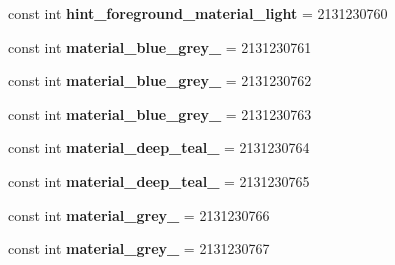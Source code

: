 \begin{DoxyCompactItemize}
\item 
\hypertarget{classClient_1_1Droid_1_1Resource_1_1Color_ac0c400e05663e3e22f4b495dfc34a48b}{}const int {\bfseries hint\+\_\+foreground\+\_\+material\+\_\+light} = 2131230760\label{classClient_1_1Droid_1_1Resource_1_1Color_ac0c400e05663e3e22f4b495dfc34a48b}

\item 
\hypertarget{classClient_1_1Droid_1_1Resource_1_1Color_ae6969d9cf3f2532d9702415e0842bc8d}{}const int {\bfseries material\+\_\+blue\+\_\+grey\+\_} = 2131230761\label{classClient_1_1Droid_1_1Resource_1_1Color_ae6969d9cf3f2532d9702415e0842bc8d}

\item 
\hypertarget{classClient_1_1Droid_1_1Resource_1_1Color_ad5eae1997bab4de0de3f9a33f0cc07a3}{}const int {\bfseries material\+\_\+blue\+\_\+grey\+\_} = 2131230762\label{classClient_1_1Droid_1_1Resource_1_1Color_ad5eae1997bab4de0de3f9a33f0cc07a3}

\item 
\hypertarget{classClient_1_1Droid_1_1Resource_1_1Color_acbba04b06523ce03abf1c4b813ec56b2}{}const int {\bfseries material\+\_\+blue\+\_\+grey\+\_} = 2131230763\label{classClient_1_1Droid_1_1Resource_1_1Color_acbba04b06523ce03abf1c4b813ec56b2}

\item 
\hypertarget{classClient_1_1Droid_1_1Resource_1_1Color_a89b4f470c9563b76f4cd9bab4edc4154}{}const int {\bfseries material\+\_\+deep\+\_\+teal\+\_} = 2131230764\label{classClient_1_1Droid_1_1Resource_1_1Color_a89b4f470c9563b76f4cd9bab4edc4154}

\item 
\hypertarget{classClient_1_1Droid_1_1Resource_1_1Color_aabdf5c915cd725125b64403435041ec0}{}const int {\bfseries material\+\_\+deep\+\_\+teal\+\_} = 2131230765\label{classClient_1_1Droid_1_1Resource_1_1Color_aabdf5c915cd725125b64403435041ec0}

\item 
\hypertarget{classClient_1_1Droid_1_1Resource_1_1Color_ab8cbd3bb0748c74fca4f12dc52731bf1}{}const int {\bfseries material\+\_\+grey\+\_} = 2131230766\label{classClient_1_1Droid_1_1Resource_1_1Color_ab8cbd3bb0748c74fca4f12dc52731bf1}

\item 
\hypertarget{classClient_1_1Droid_1_1Resource_1_1Color_afbaa31cbf1ba05e2fd9e2bd8f38b1cb8}{}const int {\bfseries material\+\_\+grey\+\_} = 2131230767\label{classClient_1_1Droid_1_1Resource_1_1Color_afbaa31cbf1ba05e2fd9e2bd8f38b1cb8}


\end{DoxyCompactItemize}
